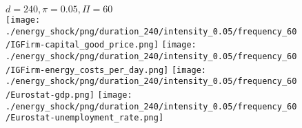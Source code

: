 \begin{figure}[ht!]
\centering\leavevmode
\begin{minipage}{17cm}
\centering\leavevmode
{$d=240, \pi=0.05, \Pi=60$}\\
\texttt{[image: ./energy\_shock/png/duration\_240/intensity\_0.05/frequency\_60/IGFirm-capital\_good\_price.png]}
\texttt{[image: ./energy\_shock/png/duration\_240/intensity\_0.05/frequency\_60/IGFirm-energy\_costs\_per\_day.png]}
\texttt{[image: ./energy\_shock/png/duration\_240/intensity\_0.05/frequency\_60/Eurostat-gdp.png]}
\texttt{[image: ./energy\_shock/png/duration\_240/intensity\_0.05/frequency\_60/Eurostat-unemployment\_rate.png]}
\end{minipage}
\end{figure}

